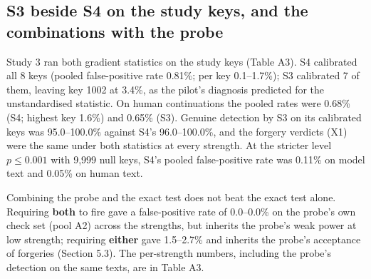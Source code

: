 \documentclass[11pt,letterpaper]{article}
\begin{document}
\hypertarget{s3-beside-s4-on-the-study-keys-and-the-combinations-with-the-probe}{%
\subsection{S3 beside S4 on the study keys, and the combinations with the probe}\label{s3-beside-s4-on-the-study-keys-and-the-combinations-with-the-probe}}

Study 3 ran both gradient statistics on the study keys (Table A3). S4 calibrated all 8 keys (pooled false-positive rate 0.81\%; per key 0.1--1.7\%); S3 calibrated 7 of them, leaving key 1002 at 3.4\%, as the pilot's diagnosis predicted for the unstandardised statistic. On human continuations the pooled rates were 0.68\% (S4; highest key 1.6\%) and 0.65\% (S3). Genuine detection by S3 on its calibrated keys was 95.0--100.0\% against S4's 96.0--100.0\%, and the forgery verdicts (X1) were the same under both statistics at every strength. At the stricter level \(p \leq 0.001\) with 9,999 null keys, S4's pooled false-positive rate was 0.11\% on model text and 0.05\% on human text.

Combining the probe and the exact test does not beat the exact test alone. Requiring \textbf{both} to fire gave a false-positive rate of 0.0--0.0\% on the probe's own check set (pool A2) across the strengths, but inherits the probe's weak power at low strength; requiring \textbf{either} gave 1.5--2.7\% and inherits the probe's acceptance of forgeries (Section 5.3). The per-strength numbers, including the probe's detection on the same texts, are in Table A3.
\end{document}
